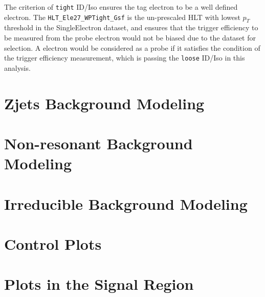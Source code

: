 The criterion of \texttt{tight} ID/Iso ensures the tag electron to be a well defined electron. The \texttt{HLT\_Ele27\_WPTight\_Gsf} is the un-prescaled HLT with lowest $p_T$ threshold in the SingleElectron dataset, and ensures that the trigger efficiency to be measured from the probe electron would not be biased due to the dataset for selection. A electron would be considered as a probe if it satisfies the condition of the trigger efficiency measurement, which is passing the \texttt{loose} ID/Iso in this analysis.

\vspace{0.3cm}



\section{Zjets Background Modeling}\label{sec:dybk}

\section{Non-resonant Background Modeling}

\section{Irreducible Background Modeling}

\section{Control Plots}

\section{Plots in the Signal Region}
